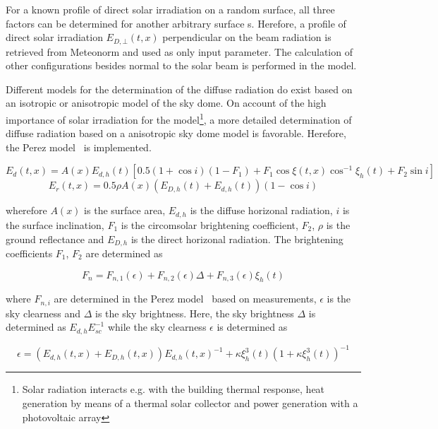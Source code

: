 For a known profile of direct solar irradiation on a random surface, all three factors can be determined for another arbitrary surface s. Herefore, a profile of direct solar irradiation $E_{D,\bot}(t,x)$ perpendicular on the beam radiation is retrieved from Meteonorm and used as only input parameter. The calculation of other configurations besides normal to the solar beam is performed in the model. 

Different models for the determination of the diffuse radiation do exist based on an isotropic or anisotropic model of the sky dome. On account of the high importance of solar irradiation for the model\footnote{Solar radiation interacts e.g. with the building thermal response, heat generation by means of a thermal solar collector and power generation with a photovoltaic array}, a more detailed determination of diffuse radiation based on a anisotropic sky dome model is favorable. Herefore, the Perez model~\cite{Perez1986,Perez1987} is implemented.

\begin{dmath}
E_{d}(t,x) =  A(x) E_{d,h}(t) \left[ 0.5 \left(1+\cos i\right) \left(1-F_{1}\right) + F_{1} \cos\xi(t,x) \cos^{-1}\xi_{h}(t) + F_{2} \sin i\right]
\end{dmath}
\begin{dmath}
E_{r}(t,x) = 0.5 \rho A(x) \left(E_{D,h}(t) + E_{d,h}(t)\right) \left(1 - \cos i\right)
\end{dmath}

wherefore $A(x)$ is the surface area, $E_{d,h}$ is the diffuse horizonal radiation, $i$ is the surface inclination, $F_{1}$ is the circomsolar brightening coefficient, $F_{2}$, $\rho$ is the ground reflectance and $E_{D,h}$ is the direct horizonal radiation. The brightening coefficients $F_{1}$, $F_{2}$ are determined as

\begin{dmath}
F_{n} = F_{n,1}(\epsilon) + F_{n,2}(\epsilon) \Delta + F_{n,3}(\epsilon) \xi_{h}(t)
\end{dmath}

where $F_{n,i}$ are determined in the Perez model~\cite{Perez1987} based on measurements, $\epsilon$ is the sky clearness and $\Delta$ is the sky brightness. Here, the sky brightness $\Delta$ is determined as $E_{d,h} E_{sc}^{-1}$ while the sky clearness $\epsilon$ is determined as

\begin{dmath}
\epsilon = \left(E_{d,h}(t,x) + E_{D,h}(t,x)\right) E_{d,h}(t,x)^{-1} + \kappa \xi_{h}^{3}(t) \left(1 + \kappa \xi_{h}^{3}(t)\right)^{-1}
\end{dmath}

